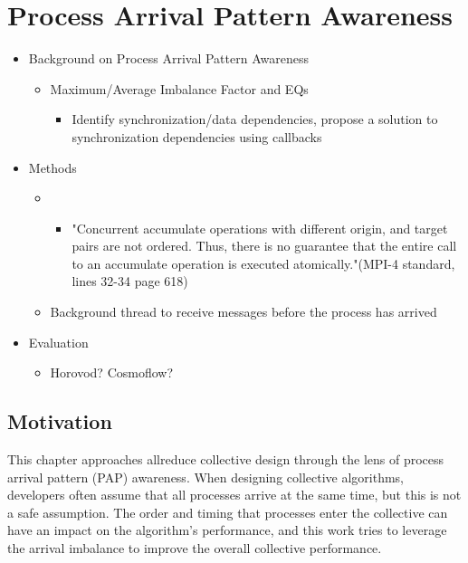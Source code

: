 
\glsresetall %
\chapter[PAPAwareness]{Process Arrival Pattern Awareness}\label{ch:PAPAwareness}

\begin{itemize}
    \item Background on Process Arrival Pattern Awareness
    \begin{itemize}
        \item Maximum/Average Imbalance Factor and EQs
        \begin{itemize}
            \item Identify synchronization/data dependencies, propose a solution to synchronization dependencies using callbacks \cite{Luo2018ADAPT}
        \end{itemize}
    \end{itemize}
    \item Methods
    \begin{itemize}
        \item 
        \begin{itemize}
            \item "Concurrent accumulate operations with different origin, and target pairs are
not ordered. Thus, there is no guarantee that the entire call to an accumulate operation is
executed atomically."(MPI-4 standard, lines 32-34 page 618)
        \end{itemize}
        \item Background thread to receive messages before the process has arrived 
    \end{itemize}
    \item Evaluation
    \begin{itemize}
        \item Horovod? Cosmoflow?
    \end{itemize}
\end{itemize}

\section{Motivation}

This chapter approaches allreduce collective design through the lens of process arrival pattern (PAP) awareness. 
When designing collective algorithms, developers often assume that all processes arrive at the same time, but this is not a safe assumption.
The order and timing that processes enter the collective can have an impact on the algorithm's performance, and this work tries to leverage the arrival imbalance to improve the overall collective performance.

